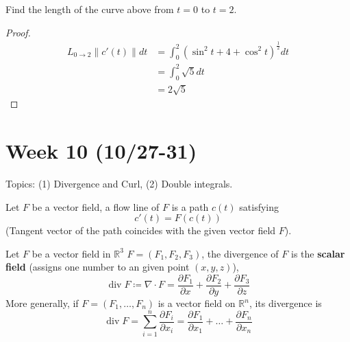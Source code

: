 \documentclass[openany]{book}
\newcommand{\R}{\mathbb{R}}
\newcommand{\diverg}{\operatorname{div}}
\begin{document}
\begin{prob}
    Find the length of the curve above from $t=0$ to $t=2$.
\end{prob}
\begin{proof}
    \begin{align*}
        L_{0\to 2}\|c'(t)\|dt&=\int_0^2\left(\sin^2t+4+\cos^2t\right)^\frac{1}{2}dt\\
        &=\int_0^2\sqrt{5}dt\\
        &=2\sqrt{5}
    \end{align*}
\end{proof}


\newpage 

\section*{\centering Week 10 (10/27-31)}



\noindent
Topics: (1) Divergence and Curl, (2) Double integrals.



\begin{defn}
    Let ${F}$ be a vector field, a flow line of $F$ is a path $c(t)$ satisfying 
    \begin{equation*}
        c'(t)=F(c(t))
    \end{equation*}
    (Tangent vector of the path coincides with the given vector field ${F}$).
\end{defn}

\begin{defn}[divergence]
    Let ${F}$ be a vector field in $\R^3$ $F=(F_1,F_2,F_3)$, the divergence of ${F}$ is the \textbf{scalar field} (assigns one number to an given point $(x, y, z)$), 
    \begin{equation*}
        \diverg F\coloneq\nabla\cdot F=\frac{\partial F_1}{\partial x}+\frac{\partial F_2}{\partial y}+\frac{\partial F_3}{\partial z}
    \end{equation*}
    More generally, if $F=(F_1,\dots, F_n)$ is a vector field on $\R^n$, its divergence is 
    \begin{equation*}
        \diverg F=\sum_{i=1}^n\frac{\partial F_i}{\partial x_i}=\frac{\partial F_1}{\partial x_1}+\dots+\frac{\partial F_n}{\partial x_n}
    \end{equation*}
\end{defn}
\end{document}
